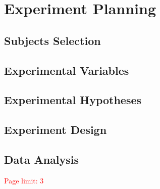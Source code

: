 \section{Experiment Planning}

\subsection{Subjects Selection}
\subsection{Experimental Variables}
\subsection{Experimental Hypotheses}
\subsection{Experiment Design}
\subsection{Data Analysis}

\textcolor{red}{Page limit: 3}
 